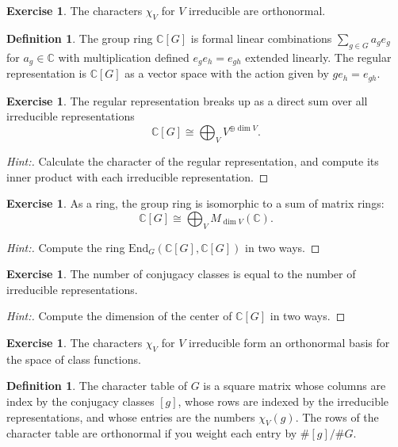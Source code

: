 \documentclass[11pt]{article}
\theoremstyle{plain}
\theoremstyle{definition}
\newtheorem{definition}[proposition]{Definition}
\newtheorem{exercise}[proposition]{Exercise}
\theoremstyle{remark}
\begin{document}
\begin{exercise}
The characters $\chi_V$ for $V$ irreducible are orthonormal.
\end{exercise}

\begin{definition}
The group ring $\mathbb{C}[G]$ is formal linear combinations $\sum_{g \in G} a_g e_g$ for $a_g \in \mathbb{C}$ with multiplication defined $e_g e_h = e_{gh}$ extended linearly.  The regular representation is $\mathbb{C}[G]$ as a vector space with the action given by $g e_h = e_{gh}$.
\end{definition}

\begin{exercise}
The regular representation breaks up as a direct sum over all irreducible representations
$$\mathbb{C}[G] \cong \bigoplus_V V^{\oplus \dim V}.$$
\end{exercise}
\begin{proof}[Hint:]
Calculate the character of the regular representation, and compute its inner product with each irreducible representation.
\end{proof}

\begin{exercise}
As a ring, the group ring is isomorphic to a sum of matrix rings:
$$\mathbb{C}[G] \cong \bigoplus_V M_{\dim V}(\mathbb{C}).$$
\end{exercise}
\begin{proof}[Hint:]
Compute the ring $\mathrm{End}_G(\mathbb{C}[G], \mathbb{C}[G])$ in two ways.
\end{proof}

\begin{exercise}
The number of conjugacy classes is equal to the number of irreducible representations.
\end{exercise}
\begin{proof}[Hint:]
Compute the dimension of the center of $\mathbb{C}[G]$ in two ways.
\end{proof}

\begin{exercise}
The characters $\chi_V$ for $V$ irreducible form an orthonormal basis for the space of class functions.
\end{exercise}

\begin{definition}
The character table of $G$ is a square matrix whose columns are index by the conjugacy classes $[g]$, whose rows are indexed by the irreducible representations, and whose entries are the numbers $\chi_V(g)$.  The rows of the character table are orthonormal if you weight each entry by $\#[g]/\#G$.
\end{definition}
\end{document}
